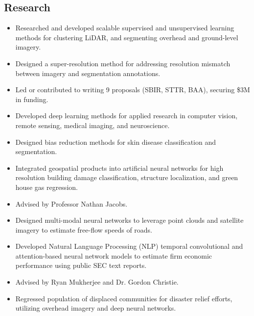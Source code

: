 \documentclass[11pt,a4paper,sans]{moderncv} %
\begin{document}
\subsection{Research}
{
\begin{itemize} 
	\item Researched and developed scalable supervised and unsupervised learning methods for clustering LiDAR, and segmenting overhead and ground-level imagery.
	\item Designed a super-resolution method for addressing resolution mismatch between imagery and segmentation annotations.
	\item Led or contributed to writing 9 proposals (SBIR, STTR, BAA), securing \$3M in funding.
\end{itemize}
}
{
\begin{itemize} 
	\item Developed deep learning methods for applied research in computer vision, remote sensing, medical imaging, and neuroscience.
	\item Designed bias reduction methods for skin disease classification and segmentation.
	\item Integrated geospatial products into artificial neural networks for high resolution building damage classification, structure localization, and green house gas regression.  
\end{itemize}
}
{
\begin{itemize} 
	\item Advised by Professor Nathan Jacobs.
	\item Designed multi-modal neural networks to leverage point clouds and satellite imagery to estimate free-flow speeds of roads.
	\item Developed Natural Language Processing (NLP) temporal convolutional and attention-based neural network models to estimate firm economic performance using public SEC text reports. 
\end{itemize}
}
{
\begin{itemize} 
	\item Advised by Ryan Mukherjee and Dr. Gordon Christie.
	\item Regressed population of displaced communities for disaster relief efforts, utilizing overhead imagery and deep neural networks.
\end{itemize}
}
\end{document}
